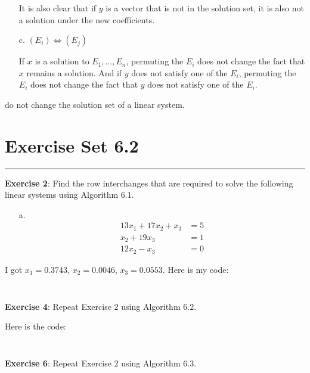 \documentclass{article}
\begin{document}
\begin{itemize}
\begin{answer}
                It is also clear that if $y$ is a vector that is not in the solution set, it is also not a solution under the new coefficients.
            \end{answer}

        \item [c.] $(E_{i}) \iff (E_{j})$
            \begin{answer}
                If $x$ is a solution to $E_{1}, \ldots, E_{n}$, permuting the $E_{i}$ does not change the fact that $x$ remains a solution. And if $y$ does not satisfy one of the $E_{i}$, permuting the $E_{i}$ does not change the fact that $y$ does not satisfy one of the $E_{i}$.
            \end{answer}
    \end{itemize}
do not change the solution set of a linear system.

\newpage
\section*{Exercise Set 6.2}
\hrule

\textbf{Exercise 2}: Find the row interchanges that are required to solve the following linear systems using Algorithm $6.1$.
    \begin{itemize}
        \item [a.] 
            \begin{align*}
                13x_{1} + 17x_{2} + x_{3} &= 5 \\
                x_{2} + 19x_{3}           &= 1 \\
                12x_{2} - x_{3}           &= 0   
            \end{align*}
    \end{itemize}
    \begin{answer}
        I got $x_{1} = 0.3743$, $x_{2} = 0.0046$, $x_{3} = 0.0553$. Here is my code:
        \inputminted{matlab}{./code/GE/GEBackward.m}
        \inputminted{matlab}{./code/script1.m}
    \end{answer}

\textbf{Exercise 4}: Repeat Exercise $2$ using Algorithm $6.2$.
    \begin{answer}
        Here is the code:
        \inputminted{matlab}{./code/GE/GEPP.m}
        \inputminted{matlab}{./code/script2.m}
    \end{answer}

\textbf{Exercise 6}: Repeat Exercise $2$ using Algorithm $6.3$.

\newpage
\end{document}
